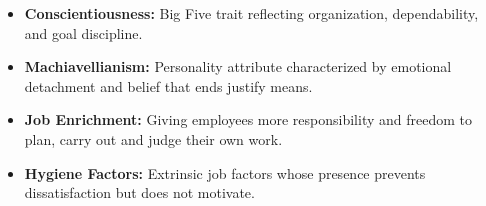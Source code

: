 \documentclass[11pt,a4paper]{article}
\begin{document}
\begin{tcolorbox}[defbox, title={\textbf{One-Line Definitions for Exam Revision}}]
  \begin{itemize}[leftmargin=*, itemsep=2pt]
    \item \textbf{Conscientiousness:} Big Five trait reflecting organization, dependability, and goal discipline.
    \item \textbf{Machiavellianism:} Personality attribute characterized by emotional detachment and belief that ends justify means.
    \item \textbf{Job Enrichment:} Giving employees more responsibility and freedom to plan, carry out and judge their own work.
    \item \textbf{Hygiene Factors:} Extrinsic job factors whose presence prevents dissatisfaction but does not motivate.
  \end{itemize}
\end{tcolorbox}
\end{document}
